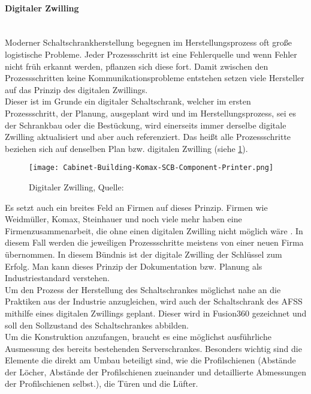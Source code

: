     \paragraph{Digitaler Zwilling}\mbox{}\\
    Moderner Schaltschrankherstellung begegnen im Herstellungsprozess oft große logistische Probleme. Jeder Prozessschritt ist eine Fehlerquelle und wenn Fehler nicht früh erkannt werden, pflanzen sich diese fort. Damit zwischen den Prozessschritten keine Kommunikationsprobleme entstehen setzen viele Hersteller auf das Prinzip des digitalen Zwillings.\\
    Dieser ist im Grunde ein digitaler Schaltschrank, welcher im ersten Prozessschritt, der Planung, ausgeplant wird und im Herstellungsprozess, sei es der Schrankbau oder die Bestückung, wird einerseits immer derselbe digitale Zwilling aktualisiert und aber auch referenziert. Das heißt alle Prozessschritte beziehen sich auf denselben Plan bzw. digitalen Zwilling (siehe \ref{fig:digilaerZwilling}).
    \begin{figure}[h]
        \centering
        \texttt{[image: Cabinet-Building-Komax-SCB-Component-Printer.png]}
        \caption{Digitaler Zwilling, Quelle: \cite{digitaler_zwilling_bild}}
        \label{fig:digilaerZwilling}
    \end{figure}
    Es setzt auch ein breites Feld an Firmen auf dieses Prinzip. Firmen wie Weidmüller, Komax, Steinhauer und noch viele mehr haben eine Firmenzusammenarbeit, die ohne einen digitalen Zwilling nicht möglich wäre \cite{smart_cabinet_building}. In diesem Fall werden die jeweiligen Prozessschritte meistens von einer neuen Firma übernommen. In diesem Bündnis ist der digitale Zwilling der Schlüssel zum Erfolg. Man kann dieses Prinzip der Dokumentation bzw. Planung als Industriestandard verstehen.\\
    Um den Prozess der Herstellung des Schaltschrankes möglichst nahe an die Praktiken aus der Industrie anzugleichen, wird auch der Schaltschrank des AFSS mithilfe eines digitalen Zwillings geplant. Dieser wird in Fusion360 gezeichnet und soll den Sollzustand des Schaltschrankes abbilden.\\
    Um die Konstruktion anzufangen, braucht es eine möglichst ausführliche Ausmessung des bereits bestehenden Serverschrankes. Besonders wichtig sind die Elemente die direkt am Umbau beteiligt sind, wie die Profilschienen (Abstände der Löcher, Abstände der Profilschienen zueinander und detaillierte Abmessungen der Profilschienen selbst.), die Türen und die Lüfter.\\

